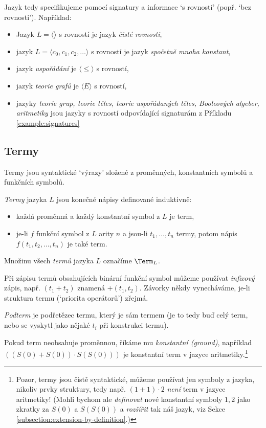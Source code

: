 Jazyk tedy specifikujeme pomocí signatury a informace `s rovností' (popř. `bez rovnosti'). Například:
\begin{itemize}
    \item Jazyk $L=\langle\rangle$ s rovností je jazyk \emph{čisté rovnosti},
    \item jazyk $L=\langle c_0,c_1,c_2,\dots\rangle$ s rovností je jazyk \emph{spočetně mnoha konstant},
    \item jazyk \emph{uspořádání} je $\langle \leq \rangle$ s rovností,
    \item jazyk \emph{teorie grafů} je $\langle E \rangle$ s rovností,
    \item jazyky \emph{teorie grup, teorie těles, teorie uspořádaných těles, Booleových algeber, aritmetiky} jsou jazyky s rovností odpovídající signaturám z Příkladu \ref{example:signatures}
\end{itemize}


\subsection{Termy}

Termy jsou syntaktické `výrazy' složené z proměnných, konstantních symbolů a funkčních symbolů.

\begin{definition}[Termy]
    \emph{Termy} jazyka $L$ jsou konečné nápisy definované induktivně:
    \begin{itemize}
        \item každá proměnná a každý konstantní symbol z $L$ je term,
        \item je-li $f$ funkční symbol z $L$ arity $n$ a jsou-li $t_1,\dots,t_n$ termy, potom nápis $f(t_1,t_2,\dots,t_n)$ je také term.
    \end{itemize}
    Množinu všech \emph{termů} jazyka $L$ označíme $\Term_L$. 
\end{definition}

Při zápisu termů obsahujících binární funkční symbol můžeme používat \emph{infixový} zápis, např. $(t_1+t_2)$ znamená $+(t_1,t_2)$. Závorky někdy vynecháváme, je-li struktura termu (`priorita operátorů') zřejmá.

\emph{Podterm} je podřetězec termu, který je sám termem (je to tedy buď celý term, nebo se vyskytl jako nějaké $t_i$ při konstrukci termu).

Pokud term neobsahuje proměnnou, říkáme mu \emph{konstantní (ground)}, například $((S(0)+S(0))\cdot S(S(0)))$ je konstantní term v jazyce aritmetiky.\footnote{Pozor, termy jsou čistě syntaktické, můžeme používat jen symboly z jazyka, nikoliv prvky struktury, tedy např. $(1+1)\cdot 2$ \emph{není} term v jazyce aritmetiky! (Mohli bychom ale \emph{definovat} nové konstantní symboly $1,2$ jako zkratky za $S(0)$ a $S(S(0))$ a \emph{rozšířit} tak náš jazyk, viz Sekce \ref{subsection:extension-by-definition}.)}

